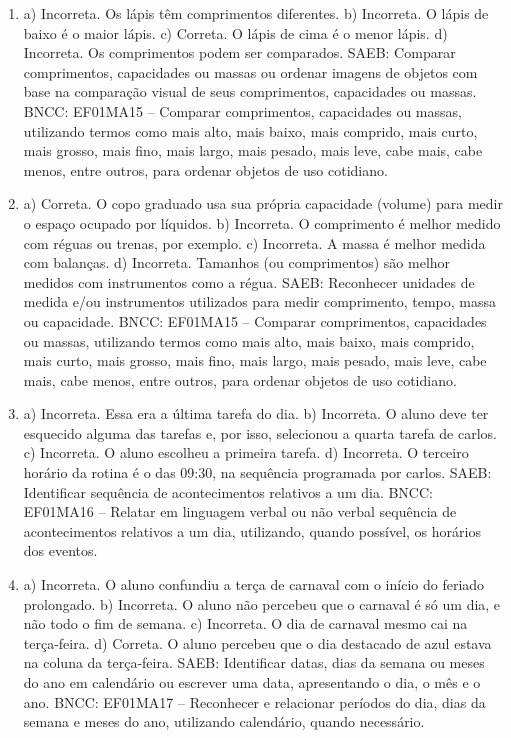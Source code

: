 \begin{enumerate}
\item
a) Incorreta. Os lápis têm comprimentos diferentes.
b) Incorreta. O lápis de baixo é o maior lápis.
c) Correta. O lápis de cima é o menor lápis.
d) Incorreta. Os comprimentos podem ser comparados.
SAEB: Comparar comprimentos, capacidades ou massas ou ordenar
imagens de objetos com base na comparação visual de seus comprimentos,
capacidades ou massas.
BNCC: EF01MA15 -- Comparar comprimentos, capacidades ou massas,
utilizando termos como mais alto, mais baixo, mais comprido, mais curto,
mais grosso, mais fino, mais largo, mais pesado, mais leve, cabe mais,
cabe menos, entre outros, para ordenar objetos de uso cotidiano.

\item
a) Correta. O copo graduado usa sua própria capacidade (volume) para
medir o espaço ocupado por líquidos.
b) Incorreta. O comprimento é melhor medido com réguas ou trenas, por exemplo.
c) Incorreta. A massa é melhor medida com balanças.
d) Incorreta. Tamanhos (ou comprimentos) são melhor medidos com instrumentos como a régua.
SAEB: Reconhecer unidades de medida e/ou instrumentos utilizados
para medir comprimento, tempo, massa ou capacidade.
BNCC: EF01MA15 -- Comparar comprimentos, capacidades ou massas,
utilizando termos como mais alto, mais baixo, mais comprido, mais curto,
mais grosso, mais fino, mais largo, mais pesado, mais leve, cabe mais,
cabe menos, entre outros, para ordenar objetos de uso cotidiano.

\item
a) Incorreta. Essa era a última tarefa do dia.
b) Incorreta. O aluno deve ter esquecido alguma das tarefas e, por isso,
selecionou a quarta tarefa de carlos.
c) Incorreta. O aluno escolheu a primeira tarefa.
d) Incorreta. O terceiro horário da rotina é o das 09:30, na sequência programada por carlos.
SAEB: Identificar sequência de acontecimentos relativos a um
dia.
BNCC: EF01MA16 -- Relatar em linguagem verbal ou não verbal sequência de
acontecimentos relativos a um dia, utilizando, quando possível, os
horários dos eventos.

\item
a) Incorreta. O aluno confundiu a terça de carnaval com o início do feriado prolongado.
b) Incorreta. O aluno não percebeu que o carnaval é só um dia, e não todo
o fim de semana.
c) Incorreta. O dia de carnaval mesmo cai na terça-feira.
d) Correta. O aluno percebeu que o dia destacado de azul estava na coluna da terça-feira.
SAEB: Identificar datas, dias da semana ou meses do ano em
calendário ou escrever uma data, apresentando o dia, o mês e o ano.
BNCC: EF01MA17 -- Reconhecer e relacionar períodos do dia, dias da semana
e meses do ano, utilizando calendário, quando necessário.


\end{enumerate}
